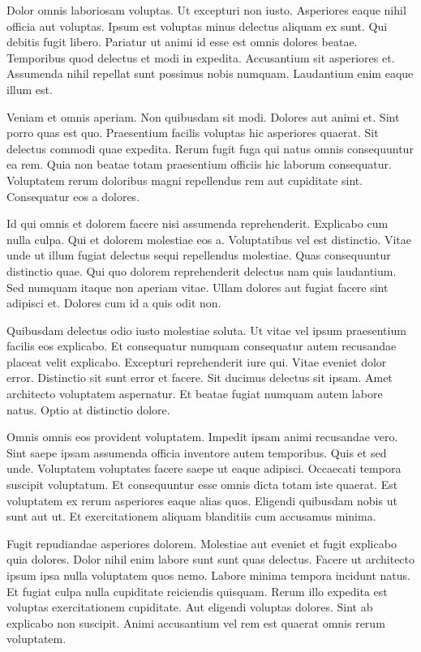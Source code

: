 Dolor omnis laboriosam voluptas. Ut excepturi non iusto. Asperiores eaque nihil officia aut voluptas. Ipsum est voluptas minus delectus aliquam ex sunt. Qui debitis fugit libero. Pariatur ut animi id esse est omnis dolores beatae. Temporibus quod delectus et modi in expedita. Accusantium sit asperiores et. Assumenda nihil repellat sunt possimus nobis numquam. Laudantium enim eaque illum est.

Veniam et omnis aperiam. Non quibusdam sit modi. Dolores aut animi et. Sint porro quas est quo. Praesentium facilis voluptas hic asperiores quaerat. Sit delectus commodi quae expedita. Rerum fugit fuga qui natus omnis consequuntur ea rem. Quia non beatae totam praesentium officiis hic laborum consequatur. Voluptatem rerum doloribus magni repellendus rem aut cupiditate sint. Consequatur eos a dolores.

Id qui omnis et dolorem facere nisi assumenda reprehenderit. Explicabo cum nulla culpa. Qui et dolorem molestiae eos a. Voluptatibus vel est distinctio. Vitae unde ut illum fugiat delectus sequi repellendus molestiae. Quas consequuntur distinctio quae. Qui quo dolorem reprehenderit delectus nam quis laudantium. Sed numquam itaque non aperiam vitae. Ullam dolores aut fugiat facere sint adipisci et. Dolores cum id a quis odit non.

Quibusdam delectus odio iusto molestiae soluta. Ut vitae vel ipsum praesentium facilis eos explicabo. Et consequatur numquam consequatur autem recusandae placeat velit explicabo. Excepturi reprehenderit iure qui. Vitae eveniet dolor error. Distinctio sit sunt error et facere. Sit ducimus delectus sit ipsam. Amet architecto voluptatem aspernatur. Et beatae fugiat numquam autem labore natus. Optio at distinctio dolore.

Omnis omnis eos provident voluptatem. Impedit ipsam animi recusandae vero. Sint saepe ipsam assumenda officia inventore autem temporibus. Quis et sed unde. Voluptatem voluptates facere saepe ut eaque adipisci. Occaecati tempora suscipit voluptatum. Et consequuntur esse omnis dicta totam iste quaerat. Est voluptatem ex rerum asperiores eaque alias quos. Eligendi quibusdam nobis ut sunt aut ut. Et exercitationem aliquam blanditiis cum accusamus minima.

Fugit repudiandae asperiores dolorem. Molestiae aut eveniet et fugit explicabo quia dolores. Dolor nihil enim labore sunt sunt quas delectus. Facere ut architecto ipsum ipsa nulla voluptatem quos nemo. Labore minima tempora incidunt natus. Et fugiat culpa nulla cupiditate reiciendis quisquam. Rerum illo expedita est voluptas exercitationem cupiditate. Aut eligendi voluptas dolores. Sint ab explicabo non suscipit. Animi accusantium vel rem est quaerat omnis rerum voluptatem.

